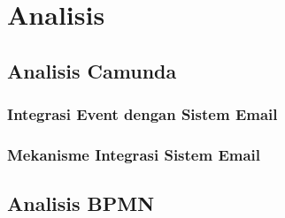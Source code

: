 \chapter{Analisis}
\label{chap:analisis}

\section{Analisis Camunda}
\label{sec:analisiscamunda}

\subsection{Integrasi Event dengan Sistem Email}
\label{sec:integrasievent}



\subsection{Mekanisme Integrasi Sistem Email}


\section{Analisis BPMN}
\label{sec:analisisbpmn}